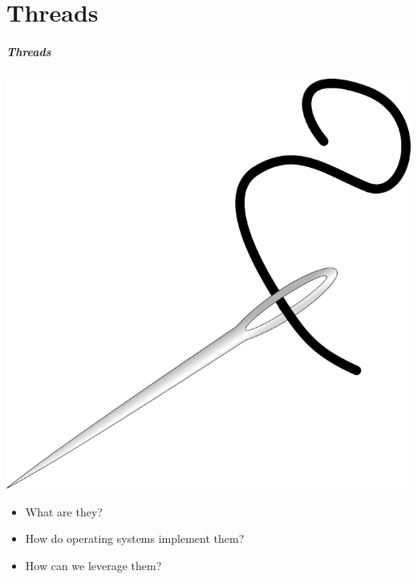 \documentclass[aspectratio=43]{beamer}
\newenvironment{changemargin}[1]{%
  \begin{list}{}{%
    \setlength{\topsep}{0pt}%
    \setlength{\leftmargin}{#1}%
    \setlength{\rightmargin}{1em}
    \setlength{\listparindent}{\parindent}%
    \setlength{\itemindent}{\parindent}%
    \setlength{\parsep}{\parskip}%
  }%
  \item[]}{\end{list}}
\begin{document}
\part{Threads}
\begin{frame}
  \partpage
\end{frame}
\begin{frame}
  \frametitle{Threads}

  \begin{center}
    \includegraphics[scale=0.1]{L03/thread}
  \end{center}

  \begin{changemargin}{2.5cm}
  \begin{itemize}
    \item What are they?
    \vfill
    \item How do operating systems implement them?
    \vfill
    \item How can we leverage them?
  \end{itemize}
  \end{changemargin}
\end{frame}
\end{document}
